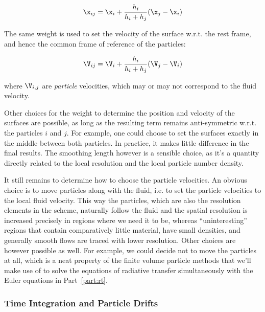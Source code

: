 \begin{align}
    \x_{ij} = \x_i + \frac{h_i}{h_i + h_j} (\x_j - \x_i)
\end{align}

The same weight is used to set the velocity of the surface w.r.t. the rest frame, and hence the
common frame of reference of the particles:

\begin{align}
    \V_{ij} = \V_i + \frac{h_i}{h_i + h_j} (\V_j - \V_i)
\end{align}

where $\V_{i,j}$ are \emph{particle} velocities, which may or may not correspond to the fluid
velocity.

Other choices for the weight to determine the position and velocity of the surfaces are possible,
as long as the resulting term remains anti-symmetric w.r.t. the particles $i$ and $j$. For example,
one could choose to set the surfaces exactly in the middle between both particles. In practice, it
makes little difference in the final results. The smoothing length however is a sensible choice, as
it's a quantity directly related to the local resolution and the local particle number density.

It still remains to determine how to choose the particle velocities. An obvious choice is to move
particles along with the fluid, i.e. to set the particle velocities to the local fluid velocity.
This way the particles, which are also the resolution elements in the scheme, naturally follow the
fluid and the spatial resolution is increased precisely in regions where we need it to be, whereas
``uninteresting'' regions that contain comparatively little material, have small densities, and
generally smooth flows are traced with lower resolution. Other choices are however possible as
well. For example, we could decide not to move the particles at all, which is a neat property of
the finite volume particle methods that we'll make use of to solve the equations of radiative
transfer simultaneously with the Euler equations in Part~\ref{part:rt}.








\subsubsection{Time Integration and Particle Drifts}


